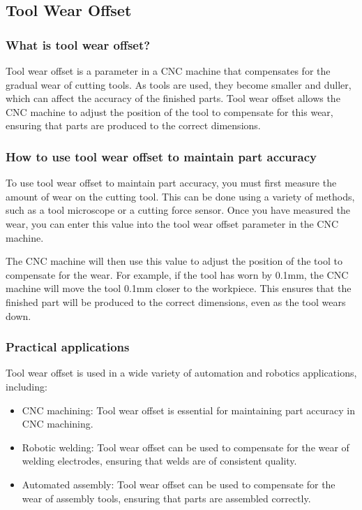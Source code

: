 \documentclass{article}
\begin{document}
\subsection*{Tool Wear Offset}

\subsubsection*{What is tool wear offset?}
Tool wear offset is a parameter in a CNC machine that compensates for the gradual wear of cutting tools. As tools are used, they become smaller and duller, which can affect the accuracy of the finished parts. Tool wear offset allows the CNC machine to adjust the position of the tool to compensate for this wear, ensuring that parts are produced to the correct dimensions.

\subsubsection*{How to use tool wear offset to maintain part accuracy}
To use tool wear offset to maintain part accuracy, you must first measure the amount of wear on the cutting tool. This can be done using a variety of methods, such as a tool microscope or a cutting force sensor. Once you have measured the wear, you can enter this value into the tool wear offset parameter in the CNC machine.

The CNC machine will then use this value to adjust the position of the tool to compensate for the wear. For example, if the tool has worn by 0.1mm, the CNC machine will move the tool 0.1mm closer to the workpiece. This ensures that the finished part will be produced to the correct dimensions, even as the tool wears down.

\subsubsection*{Practical applications}
Tool wear offset is used in a wide variety of automation and robotics applications, including:
\begin{itemize}
    \item CNC machining: Tool wear offset is essential for maintaining part accuracy in CNC machining.
    \item Robotic welding: Tool wear offset can be used to compensate for the wear of welding electrodes, ensuring that welds are of consistent quality.
    \item Automated assembly: Tool wear offset can be used to compensate for the wear of assembly tools, ensuring that parts are assembled correctly.
\end{itemize}
\end{document}
